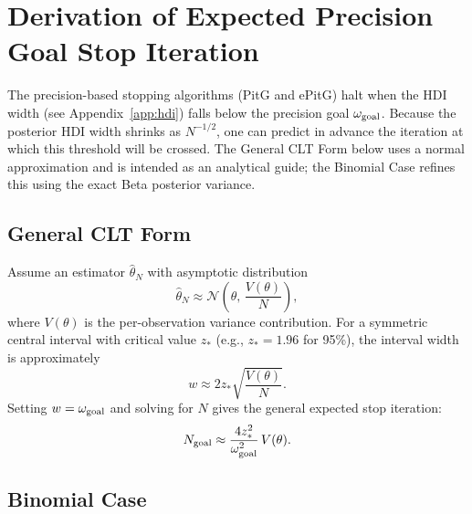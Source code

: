 \section{Derivation of Expected Precision Goal Stop Iteration}\label{app:expected_stop}

The precision-based stopping algorithms (PitG \citep{kruschke2015doing} and ePitG) halt when the HDI width
(see Appendix~\ref{app:hdi})
falls below the precision goal $\omega_{\rm goal}$. Because the posterior HDI width
shrinks as $N^{-1/2}$, one can predict in advance the iteration at which this
threshold will be crossed. The General CLT Form below uses a normal approximation
and is intended as an analytical guide; the Binomial Case refines this using the
exact Beta posterior variance.

\subsection*{General CLT Form}

Assume an estimator $\hat\theta_N$ with asymptotic distribution
\begin{equation}\label{eq:clt_general}
\hat\theta_N \approx \mathcal{N}\!\left(\theta,\,\frac{V(\theta)}{N}\right),
\end{equation}
where $V(\theta)$ is the per-observation variance contribution. For a symmetric
central interval with critical value $z_{*}$ (e.g., $z_{*}=1.96$ for 95\%), the
interval width is approximately
\begin{equation}\label{eq:hdi_width_approx}
w \approx 2 z_{*}\sqrt{\frac{V(\theta)}{N}}.
\end{equation}
Setting $w = \omega_{\rm goal}$ and solving for $N$ gives the general expected stop
iteration:
\begin{equation}\label{eq:expected_stop_iteration_clt}
N_{\rm goal} \approx \frac{4 z_{*}^{2}}{\omega_{\rm goal}^{2}}\,V(\theta).
\end{equation}

\subsection*{Binomial Case}

